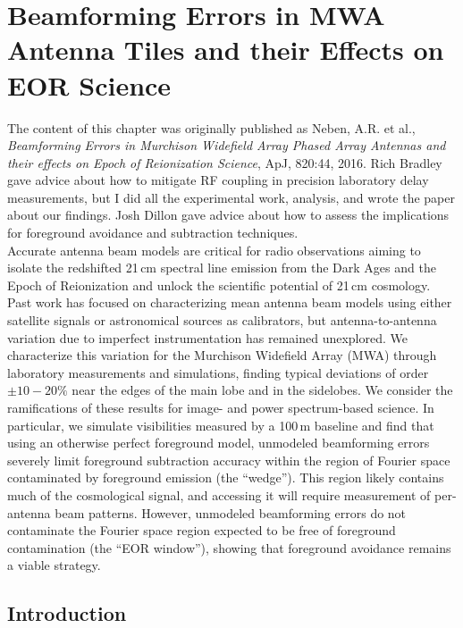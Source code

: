 \chapter{Beamforming Errors in MWA Antenna Tiles and their Effects on EOR Science}
\label{chap:bferrors}

The content of this chapter was originally published as Neben, A.R. et al., \textit{Beamforming Errors in Murchison Widefield Array Phased Array Antennas and their effects on Epoch of Reionization Science}, ApJ, 820:44, 2016. Rich Bradley gave advice about how to mitigate RF coupling in precision laboratory delay measurements, but I did all the experimental work, analysis, and wrote the paper about our findings. Josh Dillon gave advice about how to assess the implications for foreground avoidance and subtraction techniques. \\

Accurate antenna beam models are critical for radio observations aiming to isolate the redshifted 21\,cm spectral line emission from the Dark Ages and the Epoch of Reionization and unlock the scientific potential of 21\,cm cosmology. Past work has focused on characterizing mean antenna beam models using either satellite signals or astronomical sources as calibrators, but antenna-to-antenna variation due to imperfect instrumentation has remained unexplored. We characterize this variation for the Murchison Widefield Array (MWA) through laboratory measurements and simulations, finding typical deviations of order $\pm10-20\%$ near the edges of the main lobe and in the sidelobes. We consider the ramifications of these results for image- and power spectrum-based science. In particular, we simulate visibilities measured by a 100\,m baseline and find that using an otherwise perfect foreground model, unmodeled beamforming errors severely limit foreground subtraction accuracy within the region of Fourier space contaminated by foreground emission (the ``wedge''). This region likely contains much of the cosmological signal, and accessing it will require measurement of per-antenna beam patterns. However, unmodeled beamforming errors do not contaminate the Fourier space region expected to be free of foreground contamination (the ``EOR window''), showing that foreground avoidance remains a viable strategy. 

\section{Introduction}

